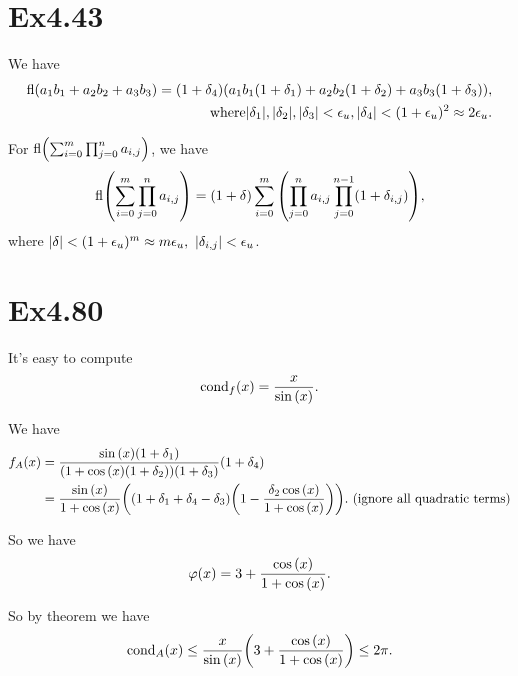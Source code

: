 \documentclass[a4paper]{article}
\begin{document}
\section*{Ex4.43}

We have
\begin{equation}
    \begin{aligned}
        \mathrm{fl} (a_1b_1 + a_2b_2 + a_3b_3) = (1+\delta_4) \qty(a_1b_1 \qty(1+\delta_1) + a_2b_2 \qty(1+\delta_2) + a_3b_3 \qty(1+\delta_3)), \\
        \mathrm{where} \abs{\delta_1}, \abs{\delta_2}, \abs{\delta_3} < \epsilon_u, \abs{\delta_4} < (1+\epsilon_u)^2 \approx 2 \epsilon_u.
    \end{aligned}
\end{equation}

For $\mathrm{fl}\qty( \sum_{i=0}^{m} \prod_{j=0}^{n} a_{i,j} )$, we have
\begin{equation}
    \mathrm{fl}\qty( \sum_{i=0}^{m} \prod_{j=0}^{n} a_{i,j} ) = (1+\delta) \sum_{i=0}^{m} \qty(\prod_{j=0}^{n} a_{i,j} \prod_{j=0}^{n-1}(1+\delta_{i,j})),
\end{equation}
where $\abs{\delta} < (1+\epsilon_u)^m \approx m \epsilon_u,~ \abs{\delta_{i,j}} < \epsilon_u$.


\section*{Ex4.80}

It's easy to compute 
\begin{equation}
    \mathrm{cond}_f(x) = \frac{x}{\sin\qty(x)}. 
\end{equation}

We have 
\begin{equation}
    \begin{aligned}
        f_A(x) &= \frac{\sin\qty(x) (1+\delta_1)}{\qty(1+ \cos\qty(x) \qty(1+\delta_2)) \qty(1+\delta_3)} \qty(1+\delta_4) \\
        &= \frac{\sin\qty(x)}{1+\cos\qty(x)}\qty(\qty(1+\delta_1+\delta_4-\delta_3) \qty(1- \frac{\delta_2 \cos\qty(x)}{1+\cos\qty(x)})). ~ (\text{ignore all quadratic terms})
    \end{aligned}
\end{equation}

So we have 
\begin{equation}
    \varphi(x) = 3 + \frac{\cos\qty(x)}{1+\cos\qty(x)}. 
\end{equation}

So by theorem we have 
\begin{equation}
    \mathrm{cond}_A(x) \leq \frac{x}{\sin\qty(x)} \qty(3 + \frac{\cos\qty(x)}{1+\cos\qty(x)}) \leq 2 \pi.
\end{equation}
\end{document}
